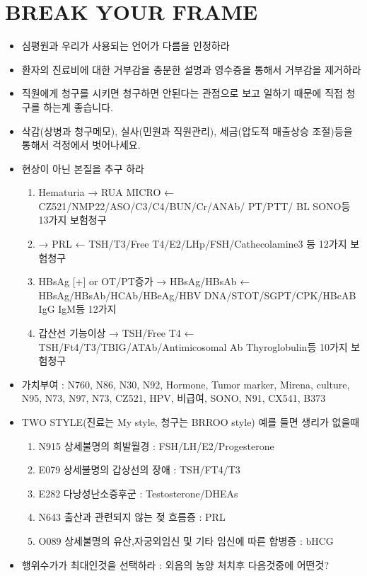 \section{BREAK YOUR FRAME}
\begin{itemize}
\item 심평원과 우리가 사용되는 언어가 다름을 인정하라
\item 환자의 진료비에 대한 거부감을 충분한 설명과 영수증을 통해서 거부감을 제거하라
\item 직원에게 청구를 시키면 청구하면 안된다는 관점으로 보고 일하기 때문에 직접 청구를 하는게 좋습니다.
\item 삭감(상병과 청구메모), 실사(민원과 직원관리), 세금(압도적 매출상승 조절)등을 통해서 걱정에서 벗어나세요.
\item 현상이 아닌 본질을 추구 하라
	\begin{enumerate}\tightlist
	\item Hematuria → RUA MICRO ← CZ521/NMP22/ASO/C3/C4/BUN/Cr/ANAb/ PT/PTT/ BL SONO등 13가지 보험청구
	\item {} → PRL ← TSH/T3/Free T4/E2/LHp/FSH/Cathecolamine3 등 12가지 보험청구
	\item HBsAg [+]  or OT/PT증가 → HBsAg/HBsAb ← HBsAg/HBsAb/HCAb/HBeAg/HBV DNA/STOT/SGPT/CPK/HBcAB IgG IgM등 12가지
	\item 갑산선 기능이상 → TSH/Free T4 ← TSH/Ft4/T3/TBIG/ATAb/Antimicosomal Ab Thyroglobulin등 10가지  보험청구
	\end{enumerate}
\item 가치부여 : N760, N86, N30, N92, Hormone, Tumor marker, Mirena, culture, N95, N73, N97, N73, CZ521, HPV, 비급여, SONO, N91, CX541, B373	
\item TWO STYLE(진료는 My style, 청구는 BRROO style) 예를 들면 생리가 없을때
	\begin{enumerate}\tightlist
	\item N915 상세불명의 희발월경 : FSH/LH/E2/Progesterone
	\item E079 상세불명의 갑상선의 장애 : TSH/FT4/T3
	\item E282 다낭성난소증후군 : Testosterone/DHEAs
	\item N643 출산과 관련되지 않는 젖 흐름증 : PRL
	\item O089 상세불명의 유산,자궁외임신 및 기타 임신에 따른 합병증 :	bHCG
	\end{enumerate}
\item 행위수가가 최대인것을 선택하라 : 외음의 농양 처치후 다음것중에 어떤것?

\end{itemize}
